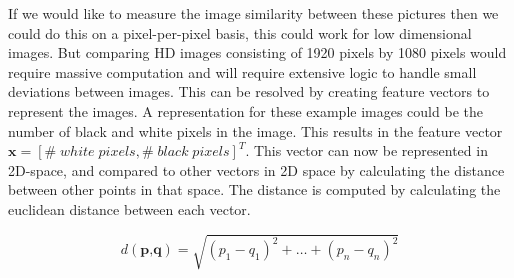 \documentclass{article}
\begin{document}
If we would like to measure the image similarity between these pictures then we could do this on a pixel-per-pixel basis, this could work for low dimensional images. But comparing HD images consisting of 1920 pixels by 1080 pixels would require massive computation and will require extensive logic to handle small deviations between images. This can be resolved by creating feature vectors to represent the images. A representation for these example images could be the number of black and white pixels in the image. This results in the feature vector $\textbf{x} = [\#\;white\;pixels, \#\;black\;pixels]^T$. This vector can now be represented in 2D-space, and compared to other vectors in 2D space by calculating the distance between other points in that space. The distance is computed by calculating the euclidean distance between each vector.

\[d(\textbf{p,q}) = \sqrt{(p_1 - q_1)^2 + \dots + (p_n - q_n)^2} \]
\end{document}
